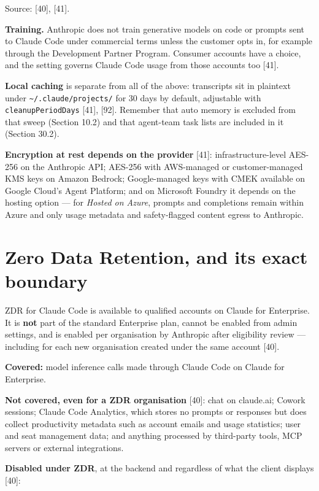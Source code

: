 \documentclass[11pt,a4paper,twoside,openany]{book}
\begin{document}
Source: [40], [41].


\textbf{Training.} Anthropic does not train generative models on code or prompts sent to Claude Code under commercial terms unless the customer opts in, for example through the Development Partner Program. Consumer accounts have a choice, and the setting governs Claude Code usage from those accounts too [41].


\textbf{Local caching} is separate from all of the above: transcripts sit in plaintext under \texttt{\textasciitilde{}/\allowbreak{}.\allowbreak{}claude/\allowbreak{}projects/\allowbreak{}} for 30 days by default, adjustable with \texttt{cleanup\allowbreak{}Period\allowbreak{}Days} [41], [92]. Remember that auto memory is excluded from that sweep (Section 10.2) and that agent-team task lists are included in it (Section 30.2).


\textbf{Encryption at rest depends on the provider} [41]: infrastructure-level AES-256 on the Anthropic API; AES-256 with AWS-managed or customer-managed KMS keys on Amazon Bedrock; Google-managed keys with CMEK available on Google Cloud's Agent Platform; and on Microsoft Foundry it depends on the hosting option — for \emph{Hosted on Azure}, prompts and completions remain within Azure and only usage metadata and safety-flagged content egress to Anthropic.


\FloatBarrier
\setcounter{section}{2}
\section{Zero Data Retention, and its exact boundary}

ZDR for Claude Code is available to qualified accounts on Claude for Enterprise. It is \textbf{not} part of the standard Enterprise plan, cannot be enabled from admin settings, and is enabled per organisation by Anthropic after eligibility review — including for each new organisation created under the same account [40].


\textbf{Covered:} model inference calls made through Claude Code on Claude for Enterprise.


\textbf{Not covered, even for a ZDR organisation} [40]: chat on claude.ai; Cowork sessions; Claude Code Analytics, which stores no prompts or responses but does collect productivity metadata such as account emails and usage statistics; user and seat management data; and anything processed by third-party tools, MCP servers or external integrations.


\textbf{Disabled under ZDR}, at the backend and regardless of what the client displays [40]:
\end{document}
